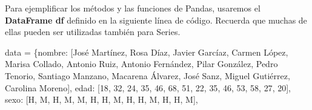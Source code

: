 \documentclass[
  letterpaper,
  DIV=11,
  numbers=noendperiod]{scrreprt}
\newenvironment{Shaded}{\begin{snugshade}}{\end{snugshade}}
\newcommand{\DecValTok}[1]{\textcolor[rgb]{0.68,0.00,0.00}{#1}}
\newcommand{\NormalTok}[1]{\textcolor[rgb]{0.00,0.23,0.31}{#1}}
\newcommand{\OperatorTok}[1]{\textcolor[rgb]{0.37,0.37,0.37}{#1}}
\newcommand{\StringTok}[1]{\textcolor[rgb]{0.13,0.47,0.30}{#1}}
\begin{document}
Para ejemplificar los métodos y las funciones de Pandas, usaremos el
\textbf{DataFrame df} definido en la siguiente línea de código. Recuerda
que muchas de ellas pueden ser utilizadas también para Series.

\begin{Shaded}
\begin{Highlighting}[]
\NormalTok{data }\OperatorTok{=}\NormalTok{ \{}\StringTok{\textquotesingle{}nombre\textquotesingle{}}\NormalTok{: [}\StringTok{\textquotesingle{}José Martínez\textquotesingle{}}\NormalTok{, }\StringTok{\textquotesingle{}Rosa Díaz\textquotesingle{}}\NormalTok{, }\StringTok{\textquotesingle{}Javier Garcíaz\textquotesingle{}}\NormalTok{, }\StringTok{\textquotesingle{}Carmen López\textquotesingle{}}\NormalTok{, }\StringTok{\textquotesingle{}Marisa Collado\textquotesingle{}}\NormalTok{, }\StringTok{\textquotesingle{}Antonio Ruiz\textquotesingle{}}\NormalTok{, }\StringTok{\textquotesingle{}Antonio Fernández\textquotesingle{}}\NormalTok{, }
                   \StringTok{\textquotesingle{}Pilar González\textquotesingle{}}\NormalTok{, }\StringTok{\textquotesingle{}Pedro Tenorio\textquotesingle{}}\NormalTok{, }\StringTok{\textquotesingle{}Santiago Manzano\textquotesingle{}}\NormalTok{, }\StringTok{\textquotesingle{}Macarena Álvarez\textquotesingle{}}\NormalTok{, }\StringTok{\textquotesingle{}José Sanz\textquotesingle{}}\NormalTok{, }\StringTok{\textquotesingle{}Miguel Gutiérrez\textquotesingle{}}\NormalTok{, }\StringTok{\textquotesingle{}Carolina Moreno\textquotesingle{}}\NormalTok{],}
        \StringTok{\textquotesingle{}edad\textquotesingle{}}\NormalTok{: [}\DecValTok{18}\NormalTok{, }\DecValTok{32}\NormalTok{, }\DecValTok{24}\NormalTok{, }\DecValTok{35}\NormalTok{, }\DecValTok{46}\NormalTok{, }\DecValTok{68}\NormalTok{, }\DecValTok{51}\NormalTok{, }\DecValTok{22}\NormalTok{, }\DecValTok{35}\NormalTok{, }\DecValTok{46}\NormalTok{, }\DecValTok{53}\NormalTok{, }\DecValTok{58}\NormalTok{, }\DecValTok{27}\NormalTok{, }\DecValTok{20}\NormalTok{],}
        \StringTok{\textquotesingle{}sexo\textquotesingle{}}\NormalTok{: [}\StringTok{\textquotesingle{}H\textquotesingle{}}\NormalTok{, }\StringTok{\textquotesingle{}M\textquotesingle{}}\NormalTok{, }\StringTok{\textquotesingle{}H\textquotesingle{}}\NormalTok{, }\StringTok{\textquotesingle{}M\textquotesingle{}}\NormalTok{, }\StringTok{\textquotesingle{}M\textquotesingle{}}\NormalTok{, }\StringTok{\textquotesingle{}H\textquotesingle{}}\NormalTok{, }\StringTok{\textquotesingle{}H\textquotesingle{}}\NormalTok{, }\StringTok{\textquotesingle{}M\textquotesingle{}}\NormalTok{, }\StringTok{\textquotesingle{}H\textquotesingle{}}\NormalTok{, }\StringTok{\textquotesingle{}H\textquotesingle{}}\NormalTok{, }\StringTok{\textquotesingle{}M\textquotesingle{}}\NormalTok{, }\StringTok{\textquotesingle{}H\textquotesingle{}}\NormalTok{, }\StringTok{\textquotesingle{}H\textquotesingle{}}\NormalTok{, }\StringTok{\textquotesingle{}M\textquotesingle{}}\NormalTok{],}

\end{Highlighting}
\end{Shaded}
\end{document}
